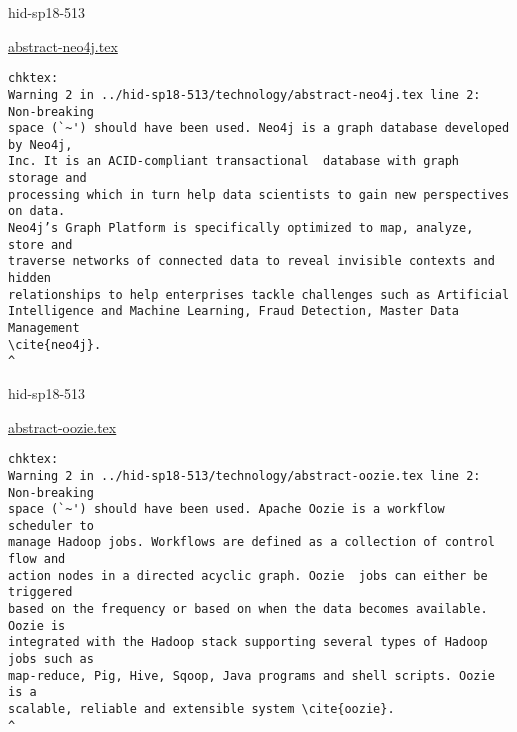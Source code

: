\begin{IU}

hid-sp18-513

\href{https://github.com/cloudmesh-community/hid-sp18-513/blob/master//technology/abstract-neo4j.tex}{abstract-neo4j.tex}

\begin{tiny}
\begin{verbatim}
chktex:
Warning 2 in ../hid-sp18-513/technology/abstract-neo4j.tex line 2: Non-breaking
space (`~') should have been used. Neo4j is a graph database developed by Neo4j,
Inc. It is an ACID-compliant transactional  database with graph storage and
processing which in turn help data scientists to gain new perspectives on data.
Neo4j’s Graph Platform is specifically optimized to map, analyze, store and
traverse networks of connected data to reveal invisible contexts and hidden
relationships to help enterprises tackle challenges such as Artificial
Intelligence and Machine Learning, Fraud Detection, Master Data Management
\cite{neo4j}.
^
\end{verbatim}
\end{tiny}
\end{IU}



\begin{IU}

hid-sp18-513

\href{https://github.com/cloudmesh-community/hid-sp18-513/blob/master//technology/abstract-oozie.tex}{abstract-oozie.tex}

\begin{tiny}
\begin{verbatim}
chktex:
Warning 2 in ../hid-sp18-513/technology/abstract-oozie.tex line 2: Non-breaking
space (`~') should have been used. Apache Oozie is a workflow scheduler to
manage Hadoop jobs. Workflows are defined as a collection of control flow and
action nodes in a directed acyclic graph. Oozie  jobs can either be triggered
based on the frequency or based on when the data becomes available. Oozie is
integrated with the Hadoop stack supporting several types of Hadoop jobs such as
map-reduce, Pig, Hive, Sqoop, Java programs and shell scripts. Oozie is a
scalable, reliable and extensible system \cite{oozie}.
^
\end{verbatim}
\end{tiny}
\end{IU}



